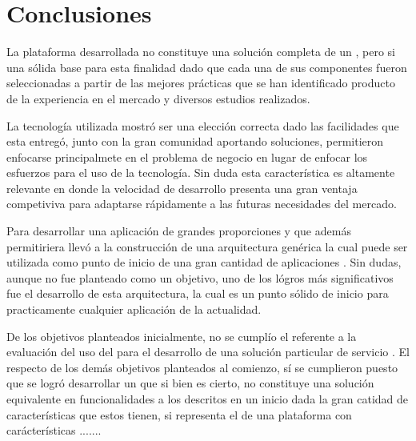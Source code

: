 

\chapter{Conclusiones} \label{cap:conclusiones}
	
	La plataforma desarrollada no constituye una solución completa de un \frameworkPC \ecommerceCOM, pero si una sólida base para esta finalidad dado que cada una de sus componentes fueron seleccionadas a partir de las mejores prácticas que se han identificado producto de la experiencia en el mercado y diversos estudios realizados.

	La tecnología utilizada mostró ser una elección correcta dado las facilidades que esta entregó, junto con la gran comunidad aportando soluciones, permitieron enfocarse principalmete en el problema de negocio en lugar de enfocar los esfuerzos para el uso de la tecnología. Sin duda esta característica es altamente relevante en donde la velocidad de desarrollo presenta una gran ventaja competiviva para adaptarse rápidamente a las futuras necesidades del mercado.

	Para desarrollar una aplicación de grandes proporciones y que además permitiriera llevó a la construcción de una arquitectura genérica la cual puede ser utilizada como punto de inicio de una gran cantidad de aplicaciones \webINT.  
	Sin dudas, aunque no fue planteado como un objetivo, uno de los lógros más significativos fue el desarrollo de esta arquitectura, la cual es un punto sólido de inicio para practicamente cualquier aplicación \webINT de la actualidad.

	De los objetivos planteados inicialmente, no se cumplío el referente a la evaluación del uso del \frameworkPC para el desarrollo de una solución particular de servicio \ecommerceCOM.
	El respecto de los demás objetivos planteados al comienzo, sí se cumplieron puesto que se logró desarrollar un \frameworkPC que si bien es cierto, no constituye una solución equivalente en funcionalidades a los \frameworkPC descritos en un inicio dada la gran catidad de características que estos tienen, si representa el \coreAS de una plataforma con carácterísticas .......



